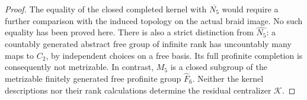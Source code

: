 \begin{proof}
The equality of the closed completed kernel with
$\overline{N_5}$ would require a further comparison
with the induced topology on the actual braid image.
No such equality has been proved here.
There is also a strict distinction from
$\widehat{N_5}$: a countably generated abstract free
group of infinite rank has uncountably many maps
to $C_2$, by independent choices on a free basis.
Its full profinite completion is consequently not
metrizable.  In contrast, $M_5$ is a closed subgroup
of the metrizable finitely generated free profinite
group $\widehat F_6$.
Neither the kernel descriptions nor their rank
calculations determine the residual centralizer
$\mathcal K$.
\end{proof}
